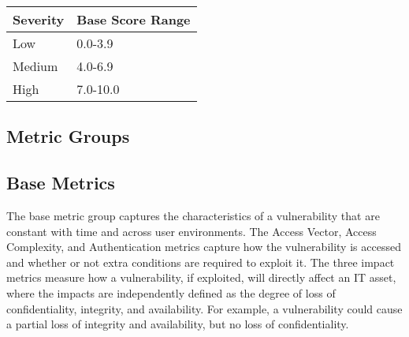   \begin{longtable}[]{@{}ll@{}}
  \toprule
  \begin{minipage}[b]{0.14\columnwidth}\raggedright\strut
  Severity
  \strut\end{minipage} &
  \begin{minipage}[b]{0.25\columnwidth}\raggedright\strut
  Base Score Range
  \strut\end{minipage}\tabularnewline
  \midrule
  \endhead
  \begin{minipage}[t]{0.14\columnwidth}\raggedright\strut
  Low
  \strut\end{minipage} &
  \begin{minipage}[t]{0.25\columnwidth}\raggedright\strut
  0.0-3.9
  \strut\end{minipage}\tabularnewline
  \begin{minipage}[t]{0.14\columnwidth}\raggedright\strut
  Medium
  \strut\end{minipage} &
  \begin{minipage}[t]{0.25\columnwidth}\raggedright\strut
  4.0-6.9
  \strut\end{minipage}\tabularnewline
  \begin{minipage}[t]{0.14\columnwidth}\raggedright\strut
  High
  \strut\end{minipage} &
  \begin{minipage}[t]{0.25\columnwidth}\raggedright\strut
  7.0-10.0
  \strut\end{minipage}\tabularnewline
  \bottomrule
  \end{longtable}

  \subsection{Metric Groups}\label{metric-groups}

  \subsection{Base Metrics}\label{base-metrics}

  The base metric group captures the characteristics of a vulnerability
  that are constant with time and across user environments. The Access
  Vector, Access Complexity, and Authentication metrics capture how the
  vulnerability is accessed and whether or not extra conditions are
  required to exploit it. The three impact metrics measure how a
  vulnerability, if exploited, will directly affect an IT asset, where the
  impacts are independently defined as the degree of loss of
  confidentiality, integrity, and availability. For example, a
  vulnerability could cause a partial loss of integrity and availability,
  but no loss of confidentiality.

